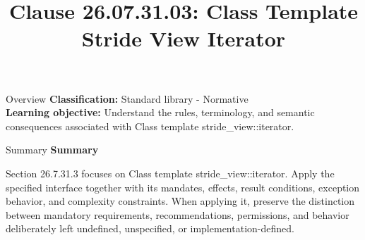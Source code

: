 \documentclass[10pt,letterpaper]{article}
\title{Clause 26.07.31.03: Class Template Stride View Iterator}
\author{}
\date{}
\begin{document}
\maketitle
\begin{CornellOverviewBox}{Overview}
\textbf{Classification:} Standard library - Normative\\[2pt]
\textbf{Learning objective:} Understand the rules, terminology, and semantic consequences associated with Class template stride\_view::iterator.
\end{CornellOverviewBox}\begin{CornellSummaryBox}{Summary}
{\sffamily\bfseries\color{Accent} Summary}\par\vspace{3pt}Section 26.7.31.3 focuses on Class template stride\_view::iterator. Apply the specified interface together with its mandates, effects, result conditions, exception behavior, and complexity constraints. When applying it, preserve the distinction between mandatory requirements, recommendations, permissions, and behavior deliberately left undefined, unspecified, or implementation-defined.
\end{CornellSummaryBox}
\end{document}
